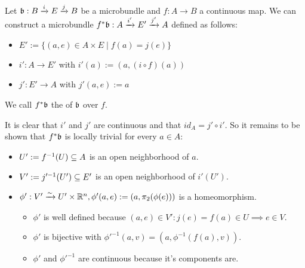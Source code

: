  \\
Let $\bb: \bundle{B}{E}{i}{j}$ be a microbundle and $f: A \to B$ a continuous map.
We can construct a microbundle $f^*\bb: \bundle{A}{E'}{i'}{j'}$ defined as follows:
\begin{itemize}
    \item $E' := \{ (a, e) \in A \times E \mid f(a) = j(e) \}$
    \item $i': A \to E'$ with $i'(a) := (a, (i \circ f)(a))$
    \item $j': E' \to A$ with $j'(a, e) := a$
\end{itemize}
We call $f^*\bb$ the  of $\bb$ over $f$.
\begin{myproof}
It is clear that $i'$ and $j'$ are continuous and that $id_A = j' \circ i'$.
So it remains to be shown that $f^*\bb$ is locally trivial for every $a \in A$:
\begin{itemize}
    \item $U' := f^{-1}(U) \sub A$ is an open neighborhood of $a$.
    \item $V' := j'^{-1}(U') \sub E'$ is an open neighborhood of $i'(U')$.
    \item $\phi': V' \isomto U' \times \R^n, \phi'(a, e) := (a, \pi_2(\phi(e)))$ is a homeomorphism.
    \begin{itemize}
        \item $\phi'$ is well defined because $(a, e) \in V': j(e) = f(a) \in U \implies e \in V$.
        \item $\phi'$ is bijective with $\phi'^{-1}(a, v) = (a, \phi^{-1}(f(a), v))$.
        \item $\phi'$ and $\phi'^{-1}$ are continuous because it's components are.
    \end{itemize}
\end{itemize}
\end{myproof}